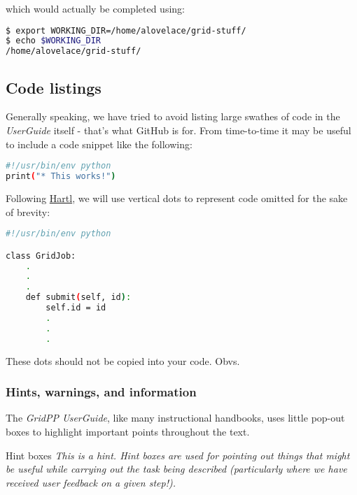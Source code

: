 which would actually be completed using:

\begin{lstlisting}[gobble=0,numbers=none,language=bash]
$ export WORKING_DIR=/home/alovelace/grid-stuff/
$ echo $WORKING_DIR
/home/alovelace/grid-stuff/
\end{lstlisting}

\subsection{Code listings}
\label{code-listings}
Generally speaking, we have tried to avoid listing large swathes of code
in the \emph{UserGuide} itself - that's what GitHub is for. From
time-to-time it may be useful to include a code snippet like the
following:

\begin{lstlisting}[gobble=0,numbers=none,language=bash]
#!/usr/bin/env python
print("* This works!")
\end{lstlisting}

Following \href{https://www.railstutorial.org}{Hartl}, we will use
vertical dots to represent code omitted for the sake of brevity:

\begin{lstlisting}[gobble=0,numbers=none,language=bash]
#!/usr/bin/env python

class GridJob:
    .
    .
    .
    def submit(self, id):
        self.id = id
        .
        .
        .
\end{lstlisting}

These dots should not be copied into your code. Obvs.

\subsubsection{Hints, warnings, and information}
\label{hints-warnings-and-information}
The \emph{GridPP UserGuide}, like many instructional handbooks, uses
little pop-out boxes to highlight important points throughout the text.

\begin{hintbox}{Hint boxes}
\emph{This is a hint. Hint boxes are used for pointing out things that might
be useful while carrying out the task being described (particularly
where we have received user feedback on a given step!).}
\end{hintbox}

